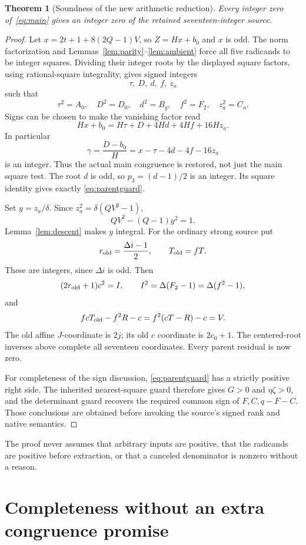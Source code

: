 \documentclass[11pt]{article}
\newtheorem{theorem}{Theorem}[section]
\theoremstyle{remark}
\begin{document}
\begin{theorem}[Soundness of the new arithmetic reduction]\label{thm:sound}
Every integer zero of~\eqref{eq:main} gives an integer zero of the retained
seventeen-integer source.
\end{theorem}
\begin{proof}
Let \(x=2t+1+8(2Q-1)V\), so \(Z=Hx+b_0\) and \(x\) is odd.
The norm factorization and Lemmas~\ref{lem:parity}--\ref{lem:ambient}
force all five radicands to be integer squares.
Dividing their integer roots by the displayed square factors, using
rational-square integrality, gives signed integers
\[
 \tau,\ D,\ d,\ f,\ z_a
\]
such that
\[
 \tau^2=A_0,\quad D^2=D_0,\quad d^2=B_g,\quad
 f^2=F_2,\quad z_a^2=C_a.
\]
Signs can be chosen to make the vanishing factor read
\begin{equation}
 Hx+b_0=H\tau+D+4Hd+4Hf+16Hz_a.                            \label{eq:rootsum}
\end{equation}
In particular
\[
 \gamma=\frac{D-b_0}{H}=x-\tau-4d-4f-16z_a
\]
is an integer. Thus the actual main congruence is restored, not just
the main square test. The root \(d\) is odd, so
\(p_3=(d-1)/2\) is an integer. Its square identity gives exactly
\eqref{eq:parentguard}.

Set \(y=z_a/\delta\). Since \(z_a^2=\delta(QV^2-1)\),
\[
 QV^2-(Q-1)y^2=1.
\]
Lemma~\ref{lem:descent} makes \(y\) integral.
For the ordinary strong source put
\[
 r_{\rm old}=\frac{\Delta i-1}{2},\qquad T_{\rm old}=fT.
\]
These are integers, since \(\Delta i\) is odd. Then
\[
 (2r_{\rm old}+1)c^2=I,\qquad
 I^2=\Delta(F_2-1)=\Delta(f^2-1),
\]
and
\[
 fcT_{\rm old}-f^2R-c=f^2(cT-R)-c=V.
\]
The old affine \(J\)-coordinate is \(2j\); its old \(c\) coordinate is
\(2c_0+1\). The centered-root inverses above complete all seventeen
coordinates. Every parent residual is now zero.

For completeness of the sign discussion, \eqref{eq:parentguard} has a
strictly positive right side. The inherited nearest-square guard therefore
gives \(G>0\) and \(\eta\zeta>0\), and the determinant guard recovers the
required common sign of \(F,C,q-F-C\). Those conclusions are obtained
before invoking the source's signed rank and native semantics.
\end{proof}

The proof never assumes that arbitrary inputs are positive, that the
radicands are positive before extraction, or that a canceled denominator
is nonzero without a reason.

\section{Completeness without an extra congruence promise}
\end{document}
